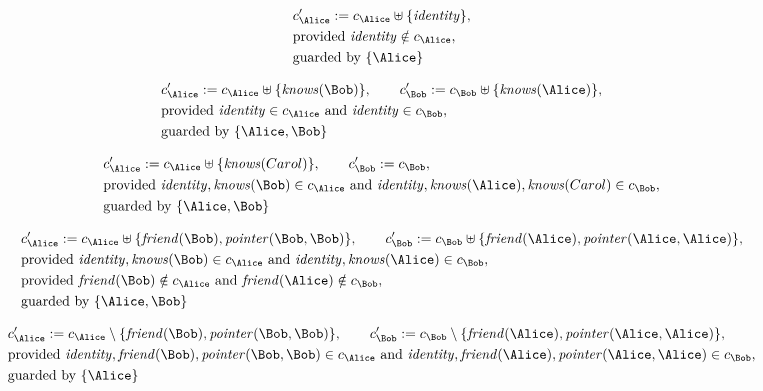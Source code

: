 \begin{align*}
&
c'_
{
\Alice
}
 := 
c_
{
\Alice
}
 \uplus 
\{
\mathit{
identity
}
\}
,\\
&
\text{provided } 
\mathit{
identity
}
 \notin c_
{
\Alice
}
,\\
&
\text{guarded by } \{
\Alice
\}
\end{align*}

\begin{align*}
&
c'_
{
\Alice
}
 := 
c_
{
\Alice
}
 \uplus 
\{
\mathit{
knows
}
(
\Bob
)
\}
, \qquad 
c'_
{
\Bob
}
 := 
c_
{
\Bob
}
 \uplus 
\{
\mathit{
knows
}
(
\Alice
)
\}
,\\
&
\text{provided } 
\mathit{
identity
}
 \in c_
{
\Alice
}
 \text{ and } 
\mathit{
identity
}
 \in c_
{
\Bob
}
,\\
&
\text{guarded by } \{
\Alice
,
\Bob
\}
\end{align*}

\begin{align*}
&
c'_
{
\Alice
}
 := 
c_
{
\Alice
}
 \uplus 
\{
\mathit{
knows
}
(
Carol
)
\}
, \qquad 
c'_
{
\Bob
}
 := 
c_
{
\Bob
}
,\\
&
\text{provided } 
\mathit{
identity
}
,
\mathit{
knows
}
(
\Bob
)
 \in c_
{
\Alice
}
 \text{ and } 
\mathit{
identity
}
,
\mathit{
knows
}
(
\Alice
)
,
\mathit{
knows
}
(
Carol
)
 \in c_
{
\Bob
}
,\\
&
\text{guarded by } \{
\Alice
,
\Bob
\}
\end{align*}

\begin{align*}
&
c'_
{
\Alice
}
 := 
c_
{
\Alice
}
 \uplus 
\{
\mathit{
friend
}
(
\Bob
)
,
\mathit{
pointer
}
(
\Bob
,
\Bob
)
\}
, \qquad 
c'_
{
\Bob
}
 := 
c_
{
\Bob
}
 \uplus 
\{
\mathit{
friend
}
(
\Alice
)
,
\mathit{
pointer
}
(
\Alice
,
\Alice
)
\}
,\\
&
\text{provided } 
\mathit{
identity
}
,
\mathit{
knows
}
(
\Bob
)
 \in c_
{
\Alice
}
 \text{ and } 
\mathit{
identity
}
,
\mathit{
knows
}
(
\Alice
)
 \in c_
{
\Bob
}
,\\
&
\text{provided } 
\mathit{
friend
}
(
\Bob
)
 \notin c_
{
\Alice
}
 \text{ and } 
\mathit{
friend
}
(
\Alice
)
 \notin c_
{
\Bob
}
,\\
&
\text{guarded by } \{
\Alice
,
\Bob
\}
\end{align*}

\begin{align*}
&
c'_
{
\Alice
}
 := 
c_
{
\Alice
}
 \setminus 
\{
\mathit{
friend
}
(
\Bob
)
,
\mathit{
pointer
}
(
\Bob
,
\Bob
)
\}
, \qquad 
c'_
{
\Bob
}
 := 
c_
{
\Bob
}
 \setminus 
\{
\mathit{
friend
}
(
\Alice
)
,
\mathit{
pointer
}
(
\Alice
,
\Alice
)
\}
,\\
&
\text{provided } 
\mathit{
identity
}
,
\mathit{
friend
}
(
\Bob
)
,
\mathit{
pointer
}
(
\Bob
,
\Bob
)
 \in c_
{
\Alice
}
 \text{ and } 
\mathit{
identity
}
,
\mathit{
friend
}
(
\Alice
)
,
\mathit{
pointer
}
(
\Alice
,
\Alice
)
 \in c_
{
\Bob
}
,\\
&
\text{guarded by } \{
\Alice
\}
\end{align*}
